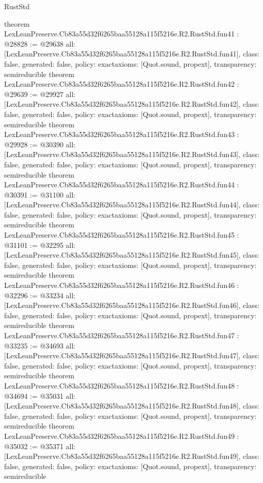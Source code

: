 \begin{lexlean}{RustStd}
\begin{coremodule}
{}
theorem LexLeanPreserve.Cb83a55d32f6265baa55128a115f5216e.R2.RustStd.fun41 : @28828 := @29638 {
  all: [LexLeanPreserve.Cb83a55d32f6265baa55128a115f5216e.R2.RustStd.fun41],
  class: false,
  generated: false,
  policy: exact{axioms: [Quot.sound, propext]},
  transparency: semireducible
}
theorem LexLeanPreserve.Cb83a55d32f6265baa55128a115f5216e.R2.RustStd.fun42 : @29639 := @29927 {
  all: [LexLeanPreserve.Cb83a55d32f6265baa55128a115f5216e.R2.RustStd.fun42],
  class: false,
  generated: false,
  policy: exact{axioms: [Quot.sound, propext]},
  transparency: semireducible
}
theorem LexLeanPreserve.Cb83a55d32f6265baa55128a115f5216e.R2.RustStd.fun43 : @29928 := @30390 {
  all: [LexLeanPreserve.Cb83a55d32f6265baa55128a115f5216e.R2.RustStd.fun43],
  class: false,
  generated: false,
  policy: exact{axioms: [Quot.sound, propext]},
  transparency: semireducible
}
theorem LexLeanPreserve.Cb83a55d32f6265baa55128a115f5216e.R2.RustStd.fun44 : @30391 := @31100 {
  all: [LexLeanPreserve.Cb83a55d32f6265baa55128a115f5216e.R2.RustStd.fun44],
  class: false,
  generated: false,
  policy: exact{axioms: [Quot.sound, propext]},
  transparency: semireducible
}
theorem LexLeanPreserve.Cb83a55d32f6265baa55128a115f5216e.R2.RustStd.fun45 : @31101 := @32295 {
  all: [LexLeanPreserve.Cb83a55d32f6265baa55128a115f5216e.R2.RustStd.fun45],
  class: false,
  generated: false,
  policy: exact{axioms: [Quot.sound, propext]},
  transparency: semireducible
}
theorem LexLeanPreserve.Cb83a55d32f6265baa55128a115f5216e.R2.RustStd.fun46 : @32296 := @33234 {
  all: [LexLeanPreserve.Cb83a55d32f6265baa55128a115f5216e.R2.RustStd.fun46],
  class: false,
  generated: false,
  policy: exact{axioms: [Quot.sound, propext]},
  transparency: semireducible
}
theorem LexLeanPreserve.Cb83a55d32f6265baa55128a115f5216e.R2.RustStd.fun47 : @33235 := @34693 {
  all: [LexLeanPreserve.Cb83a55d32f6265baa55128a115f5216e.R2.RustStd.fun47],
  class: false,
  generated: false,
  policy: exact{axioms: [Quot.sound, propext]},
  transparency: semireducible
}
theorem LexLeanPreserve.Cb83a55d32f6265baa55128a115f5216e.R2.RustStd.fun48 : @34694 := @35031 {
  all: [LexLeanPreserve.Cb83a55d32f6265baa55128a115f5216e.R2.RustStd.fun48],
  class: false,
  generated: false,
  policy: exact{axioms: [Quot.sound, propext]},
  transparency: semireducible
}
theorem LexLeanPreserve.Cb83a55d32f6265baa55128a115f5216e.R2.RustStd.fun49 : @35032 := @35371 {
  all: [LexLeanPreserve.Cb83a55d32f6265baa55128a115f5216e.R2.RustStd.fun49],
  class: false,
  generated: false,
  policy: exact{axioms: [Quot.sound, propext]},
  transparency: semireducible
}
\end{coremodule}
\end{lexlean}
